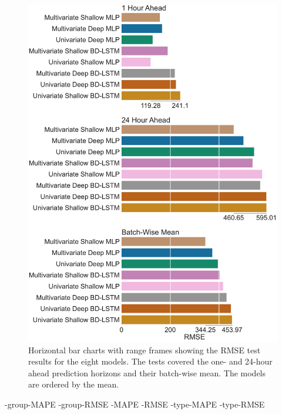 \documentclass[mstat,12pt]{unswthesis}
\begin{document}
\begin{figure}[H]
\centerline{\includegraphics[width=\columnwidth]{Figures/Plots/Test RMSE results.pdf}}
\caption{Horizontal bar charts with range frames showing the RMSE test results for the eight models. The tests covered the one- and 24-hour ahead prediction horizons and their batch-wise mean. The models are ordered by the mean.}
\label{rmse_viz}
\end{figure}

 \model-group-MAPE
 \model-group-RMSE
 \complexity-MAPE
 \complexity-RMSE
 -type-MAPE
 -type-RMSE
\end{document}

